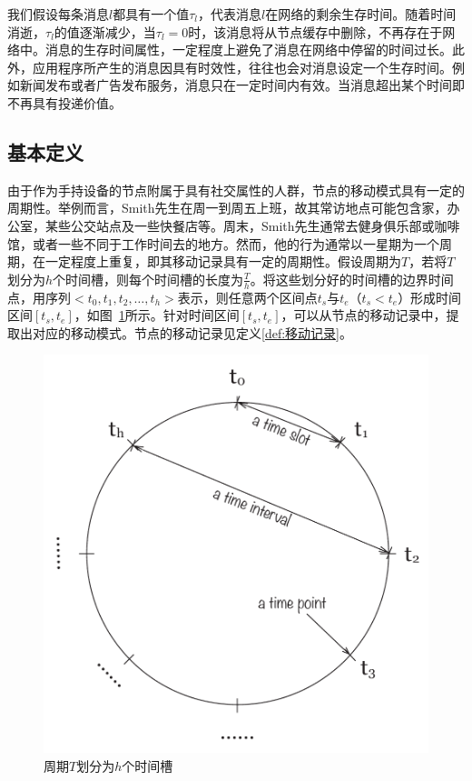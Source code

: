 我们假设每条消息$l$都具有一个值$\tau_l$，代表消息$l$在网络的剩余生存时间。随着时间消逝，$\tau_l$的值逐渐减少，当$\tau_l=0$时，该消息将从节点缓存中删除，不再存在于网络中。消息的生存时间属性，一定程度上避免了消息在网络中停留的时间过长。此外，应用程序所产生的消息因具有时效性，往往也会对消息设定一个生存时间。例如新闻发布或者广告发布服务，消息只在一定时间内有效。当消息超出某个时间即不再具有投递价值。




\subsection{基本定义}

由于作为手持设备的节点附属于具有社交属性的人群，节点的移动模式具有一定的周期性。举例而言，Smith先生在周一到周五上班，故其常访地点可能包含家，办公室，某些公交站点及一些快餐店等。周末，Smith先生通常去健身俱乐部或咖啡馆，或者一些不同于工作时间去的地方。然而，他的行为通常以一星期为一个周期，在一定程度上重复，即其移动记录具有一定的周期性。假设周期为$T$，若将$T$划分为$h$个时间槽，则每个时间槽的长度为$\frac{T}{h}$。将这些划分好的时间槽的边界时间点，用序列$<t_0,t_1,t_2,\ldots,t_h>$表示，则任意两个区间点$t_s$与$t_e$（$t_s<t_e$）形成时间区间$[t_s,t_e]$，如图\figurename~\ref{fig:chap3_time_slots}所示。针对时间区间$[t_s,t_e]$，可以从节点的移动记录中，提取出对应的移动模式。节点的移动记录见定义\ref{def:移动记录}。

\begin{figure}[!t]
\centering
  \includegraphics[width=0.55\linewidth]{paper-MPAR/time_slots}
  \caption{周期$T$划分为$h$个时间槽}
  \label{fig:chap3_time_slots}
\end{figure}

